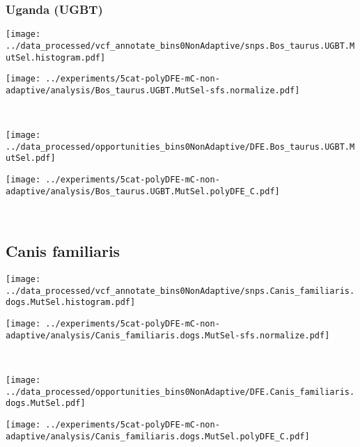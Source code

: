 \subsubsection{Uganda (UGBT)}

\begin{minipage}{0.49\linewidth}
    \texttt{[image: ../data\_processed/vcf\_annotate\_bins0NonAdaptive/snps.Bos\_taurus.UGBT.MutSel.histogram.pdf]}
\end{minipage}
\begin{minipage}{0.49\linewidth}
    \texttt{[image: ../experiments/5cat-polyDFE-mC-non-adaptive/analysis/Bos\_taurus.UGBT.MutSel-sfs.normalize.pdf]}
\end{minipage}
\\
\begin{minipage}{0.49\linewidth}
    \texttt{[image: ../data\_processed/opportunities\_bins0NonAdaptive/DFE.Bos\_taurus.UGBT.MutSel.pdf]}
\end{minipage}
\begin{minipage}{0.49\linewidth}
    \texttt{[image: ../experiments/5cat-polyDFE-mC-non-adaptive/analysis/Bos\_taurus.UGBT.MutSel.polyDFE\_C.pdf]}
\end{minipage}
\\

\subsection{Canis familiaris}

\begin{minipage}{0.49\linewidth}
    \texttt{[image: ../data\_processed/vcf\_annotate\_bins0NonAdaptive/snps.Canis\_familiaris.dogs.MutSel.histogram.pdf]}
\end{minipage}
\begin{minipage}{0.49\linewidth}
    \texttt{[image: ../experiments/5cat-polyDFE-mC-non-adaptive/analysis/Canis\_familiaris.dogs.MutSel-sfs.normalize.pdf]}
\end{minipage}
\\
\begin{minipage}{0.49\linewidth}
    \texttt{[image: ../data\_processed/opportunities\_bins0NonAdaptive/DFE.Canis\_familiaris.dogs.MutSel.pdf]}
\end{minipage}
\begin{minipage}{0.49\linewidth}
    \texttt{[image: ../experiments/5cat-polyDFE-mC-non-adaptive/analysis/Canis\_familiaris.dogs.MutSel.polyDFE\_C.pdf]}
\end{minipage}
\\

